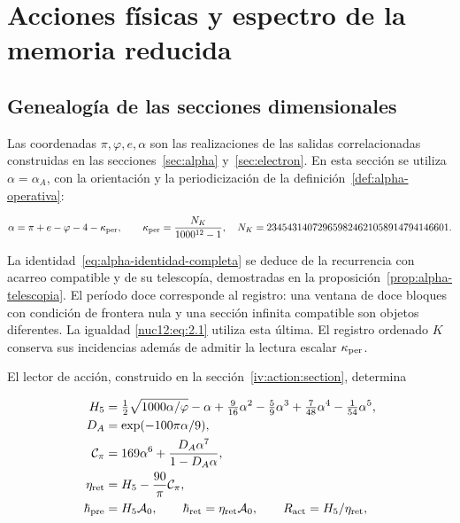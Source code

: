 \section{Acciones físicas y espectro de la memoria reducida}
\label{nuclear:12}
\subsection{Genealogía de las secciones dimensionales}

Las coordenadas \(\pi,\varphi,e,\alpha\) son las realizaciones de las salidas correlacionadas construidas en las secciones~\ref{sec:alpha} y~\ref{sec:electron}. En esta sección se utiliza \(\alpha=\alpha_A\), con la orientación y la periodicización de la definición~\ref{def:alpha-operativa}:



\begin{equation}
\alpha=\pi+e-\varphi-4-\kappa_{\rm per},\qquad
\kappa_{\rm per}=\frac{N_K}{1000^{12}-1},
\quad N_K=234543140729659824621058914794146601.
\label{nuc12:eq:2.1}
\end{equation}



La identidad~\eqref{eq:alpha-identidad-completa} se deduce de la recurrencia con acarreo compatible y de su telescopía, demostradas en la proposición~\ref{prop:alpha-telescopia}. El período doce corresponde al registro: una ventana de doce bloques con condición de frontera nula y una sección infinita compatible son objetos diferentes. La igualdad \eqref{nuc12:eq:2.1} utiliza esta última. El registro ordenado \(K\) conserva sus incidencias además de admitir la lectura escalar \(\kappa_{\rm per}\).

El lector de acción, construido en la sección~\ref{iv:action:section}, determina



\begin{equation}
\begin{aligned}
H_5&=\tfrac12\sqrt{1000\alpha/\varphi}-\alpha+
\tfrac9{16}\alpha^2-\tfrac59\alpha^3+
\tfrac7{48}\alpha^4-\tfrac1{54}\alpha^5,\\
D_A&=\exp(-100\pi\alpha/9),\\
\mathcal C_\pi&=169\alpha^6+\frac{D_A\alpha^7}{1-D_A\alpha},\\
\eta_{\rm ret}&=H_5-\frac{90}{\pi}\mathcal C_\pi,\\
\hbar_{\rm pre}&=H_5\mathcal A_0,\qquad
\hbar_{\rm ret}=\eta_{\rm ret}\mathcal A_0,\qquad
R_{\rm act}=H_5/\eta_{\rm ret},
\end{aligned}
\label{nuc12:eq:2.2}
\end{equation}



